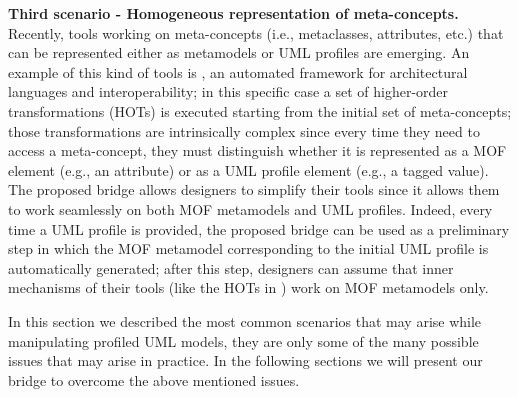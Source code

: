 \textbf{Third scenario - Homogeneous representation of meta-concepts.}
Recently, tools working on meta-concepts (i.e., metaclasses, attributes, etc.) 
that can be represented either as metamodels or UML profiles are emerging. 
An example of this kind of tools is \dually{}, 
an automated framework for architectural languages and interoperability\cite{duallyTSE}; in this specific case a set of higher-order
 transformations (HOTs) is executed starting from the initial set of meta-concepts; those transformations are intrinsically complex since
every time they need to access a meta-concept,
they must distinguish whether it is represented as a MOF element (e.g., an attribute) or as a UML profile element (e.g., a tagged value).
The proposed bridge allows designers to simplify their tools since it allows them to work seamlessly on both MOF metamodels and UML profiles. Indeed, every time a UML profile is provided, the proposed bridge can be used as a preliminary step in which 
the MOF metamodel corresponding to the initial UML profile is automatically generated; 
after this step, designers can assume that inner mechanisms of their tools (like the HOTs in \dually{}) work on MOF metamodels only. 

In this section we described the most common scenarios that may arise while manipulating profiled UML models,
they are only some of the many possible issues that may arise in practice. In the following sections we will present
our bridge to overcome the above mentioned issues.
